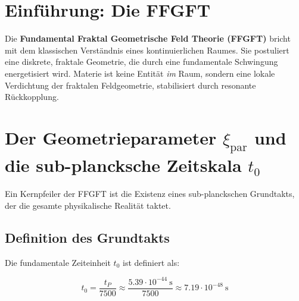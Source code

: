 	
	\maketitle
	
	\begin{abstract}
		Die \textbf{Fundamental Fraktal Geometrische Feld Theorie (FFGFT)} beschreibt die Raumzeit als ein hierarchisches System aus fraktalen Faltungen, getrieben durch den fundamentalen Geometrieparameter $\xi_{\text{par}} = 4/30000$ und die zugehörige Grundfrequenz $f_0 = 1/t_0$ im sub-planckschen Bereich. Dieses Dokument legt die vollständigen mathematischen Grundlagen dar: die exakte Definition des Grundtakts $t_0$, die Rückkopplungsbedingung im geschlossenen 4D-Phasen-Torus (der nicht mit einem 3D-Torus plus Zeitkontinuum zu verwechseln ist), die Übersetzung des 4D-Vektorraums in einen mehrdimensionalen Matrixraum sowie die photonische Realisierung durch TFLN-Hardware.
	\end{abstract}
	
	\tableofcontents
	\newpage
	
	\section{Einführung: Die FFGFT}
	
	Die \textbf{Fundamental Fraktal Geometrische Feld Theorie (FFGFT)} bricht mit dem klassischen Verständnis eines kontinuierlichen Raumes. Sie postuliert eine diskrete, fraktale Geometrie, die durch eine fundamentale Schwingung energetisiert wird. Materie ist keine Entität \textit{im} Raum, sondern eine lokale Verdichtung der fraktalen Feldgeometrie, stabilisiert durch resonante Rückkopplung.
	
	\section{Der Geometrieparameter $\xi_{\text{par}}$ und die sub-plancksche Zeitskala $t_0$}
	
	Ein Kernpfeiler der FFGFT ist die Existenz eines sub-planckschen Grundtakts, der die gesamte physikalische Realität taktet.
	
	\subsection{Definition des Grundtakts}
	
	Die fundamentale Zeiteinheit $t_0$ ist definiert als:
	
	\begin{equation}
		t_0 = \frac{t_P}{7500} \approx \frac{5.39 \cdot 10^{-44}~\text{s}}{7500} \approx 7.19 \cdot 10^{-48}~\text{s}
	\end{equation}
	
